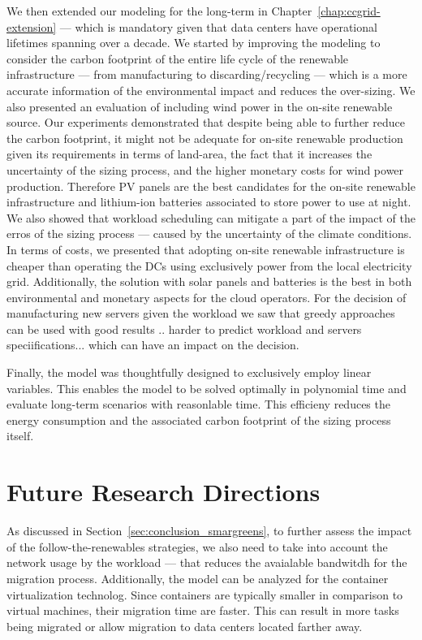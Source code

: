 We then extended our modeling for the long-term in Chapter~\ref{chap:ccgrid-extension} --- which is mandatory given that data centers have operational lifetimes spanning over a decade. We started by improving the modeling to consider the carbon footprint of the entire life cycle of the renewable infrastructure --- from manufacturing to discarding/recycling --- which is a more accurate information of the environmental impact and reduces the over-sizing. We also presented an evaluation of including wind power in the on-site renewable source. Our experiments demonstrated that despite being able to further reduce the carbon footprint, it might not be adequate for on-site renewable production given its requirements in terms of land-area, the fact that it increases the uncertainty of the sizing process, and the higher monetary costs for wind power production. Therefore PV panels are the best candidates for the on-site renewable infrastructure and lithium-ion batteries associated to store power to use at night. We also showed that workload scheduling can mitigate a part of the impact of the erros of the sizing process --- caused by the uncertainty of the climate conditions. In terms of costs, we presented that adopting on-site renewable infrastructure is cheaper than operating the DCs using exclusively power from the local electricity grid. Additionally, the solution with solar panels and batteries is the best in both environmental and monetary aspects for the cloud operators. For the decision of manufacturing new servers given the workload we saw that greedy approaches can be used with good results .. harder to predict workload and servers speciifications... which can have an impact on the decision.


Finally, the model was thoughtfully designed to exclusively employ linear variables. This enables the model to be solved optimally in polynomial time and evaluate long-term scenarios with reasonlable time. This efficieny reduces the energy consumption and the associated carbon footprint of the sizing process itself.


\section{Future Research Directions}

\label{sec:conclusion_future_research}


As discussed in Section~\ref{sec:conclusion_smargreens}, to further assess the impact of the follow-the-renewables strategies, we also need to take into account the network usage by the workload --- that  reduces the avaialable bandwitdh for the migration process. Additionally, the model can be analyzed for the container virtualization technolog. Since containers are typically smaller in comparison to virtual machines, their migration time are faster. This can result in more tasks being migrated or allow migration to data centers located farther away.


